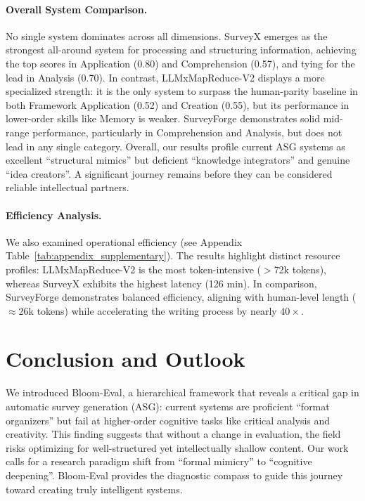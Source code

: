 \documentclass[11pt]{article}
\begin{document}
\paragraph{Overall System Comparison.}
No single system dominates across all dimensions. SurveyX emerges as the strongest all-around system for processing and structuring information, achieving the top scores in Application (0.80) and Comprehension (0.57), and tying for the lead in Analysis (0.70). In contrast, LLMxMapReduce-V2 displays a more specialized strength: it is the only system to surpass the human-parity baseline in both Framework Application (0.52) and Creation (0.55), but its performance in lower-order skills like Memory is weaker. SurveyForge demonstrates solid mid-range performance, particularly in Comprehension and Analysis, but does not lead in any single category. Overall, our results profile current ASG systems as excellent ``structural mimics'' but deficient ``knowledge integrators'' and genuine ``idea creators''. A significant journey remains before they can be considered reliable intellectual partners.

\paragraph{Efficiency Analysis.} We also examined operational efficiency (see Appendix Table~\ref{tab:appendix_supplementary}). The results highlight distinct resource profiles: LLMxMapReduce-V2 is the most token-intensive ($>$72k tokens), whereas SurveyX exhibits the highest latency (126 min). In comparison, SurveyForge demonstrates balanced efficiency, aligning with human-level length ($\approx$26k tokens) while accelerating the writing process by nearly $40\times$.

\section{Conclusion and Outlook}
We introduced Bloom-Eval, a hierarchical framework that reveals a critical gap in automatic survey generation (ASG): current systems are proficient ``format organizers'' but fail at higher-order cognitive tasks like critical analysis and creativity. This finding suggests that without a change in evaluation, the field risks optimizing for well-structured yet intellectually shallow content. Our work calls for a research paradigm shift from ``formal mimicry'' to ``cognitive deepening''. Bloom-Eval provides the diagnostic compass to guide this journey toward creating truly intelligent systems.
\end{document}
